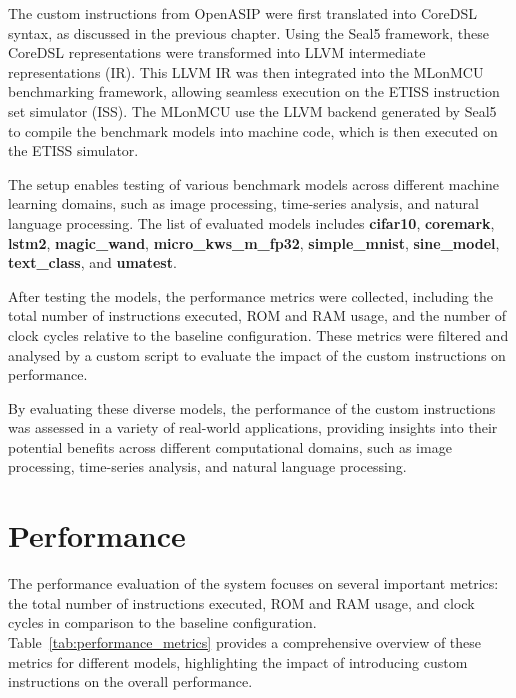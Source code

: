 The custom instructions from OpenASIP were first translated into CoreDSL syntax, as discussed in the previous chapter. Using the Seal5 framework, these CoreDSL representations were transformed into LLVM intermediate representations (IR). This LLVM IR was then integrated into the MLonMCU benchmarking framework, allowing seamless execution on the ETISS instruction set simulator (ISS). The MLonMCU use the LLVM backend generated by Seal5 to compile the benchmark models into machine code, which is then executed on the ETISS simulator.

The setup enables testing of various benchmark models across different machine learning domains, such as image processing, time-series analysis, and natural language processing. The list of evaluated models includes \textbf{cifar10}, \textbf{coremark}, \textbf{lstm2}, \textbf{magic\_wand}, \textbf{micro\_kws\_m\_fp32}, \textbf{simple\_mnist}, \textbf{sine\_model}, \textbf{text\_class}, and \textbf{umatest}.

After testing the models, the performance metrics were collected, including the total number of instructions executed, ROM and RAM usage, and the number of clock cycles relative to the baseline configuration. These metrics were filtered and analysed by a custom script to evaluate the impact of the custom instructions on performance.

By evaluating these diverse models, the performance of the custom instructions was assessed in a variety of real-world applications, providing insights into their potential benefits across different computational domains, such as image processing, time-series analysis, and natural language processing.

\section{Performance}

The performance evaluation of the system focuses on several important metrics: the total number of instructions executed, ROM and RAM usage, and clock cycles in comparison to the baseline configuration. Table~\ref{tab:performance_metrics} provides a comprehensive overview of these metrics for different models, highlighting the impact of introducing custom instructions on the overall performance.



